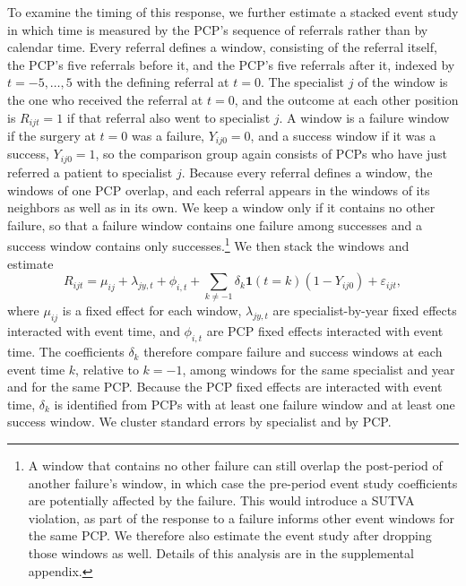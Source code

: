 \documentclass[12pt]{article}
\begin{document}
To examine the timing of this response, we further estimate a stacked event study in which time is measured by the PCP's sequence of referrals rather than by calendar time. Every referral defines a window, consisting of the referral itself, the PCP's five referrals before it, and the PCP's five referrals after it, indexed by $t=-5,\ldots,5$ with the defining referral at $t=0$. The specialist $j$ of the window is the one who received the referral at $t=0$, and the outcome at each other position is $R_{ijt}=1$ if that referral also went to specialist $j$. A window is a failure window if the surgery at $t=0$ was a failure, $Y_{ij0}=0$, and a success window if it was a success, $Y_{ij0}=1$, so the comparison group again consists of PCPs who have just referred a patient to specialist $j$. Because every referral defines a window, the windows of one PCP overlap, and each referral appears in the windows of its neighbors as well as in its own. We keep a window only if it contains no other failure, so that a failure window contains one failure among successes and a success window contains only successes.\footnote{A window that contains no other failure can still overlap the post-period of another failure's window, in which case the pre-period event study coefficients are potentially affected by the failure. This would introduce a SUTVA violation, as part of the response to a failure informs other event windows for the same PCP. We therefore also estimate the event study after dropping those windows as well. Details of this analysis are in the supplemental appendix.} We then stack the windows and estimate
\begin{equation}
  R_{ijt} = \mu_{ij} + \lambda_{j y, t} + \phi_{i, t} + \sum_{k \neq -1} \delta_k \mathbf{1}(t=k) (1-Y_{ij0}) + \varepsilon_{ijt},
  \label{eqn:rereferral_es}
\end{equation}
where $\mu_{ij}$ is a fixed effect for each window, $\lambda_{jy,t}$ are specialist-by-year fixed effects interacted with event time, and $\phi_{i,t}$ are PCP fixed effects interacted with event time. The coefficients $\delta_k$ therefore compare failure and success windows at each event time $k$, relative to $k=-1$, among windows for the same specialist and year and for the same PCP. Because the PCP fixed effects are interacted with event time, $\delta_k$ is identified from PCPs with at least one failure window and at least one success window. We cluster standard errors by specialist and by PCP.
\end{document}
